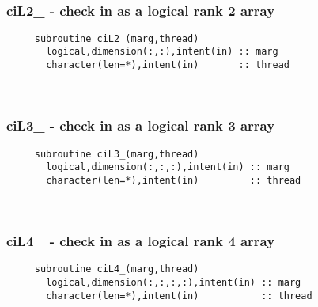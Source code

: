  
\mbox{}\hrulefill\ 
 
  \subsubsection{ciL2\_ - check in as a logical rank 2 array}

\begin{verbatim} 
     subroutine ciL2_(marg,thread)
       logical,dimension(:,:),intent(in) :: marg
       character(len=*),intent(in)       :: thread
 \end{verbatim}%
 
 
\mbox{}\hrulefill\ 
 
  \subsubsection{ciL3\_ - check in as a logical rank 3 array}

\begin{verbatim} 
     subroutine ciL3_(marg,thread)
       logical,dimension(:,:,:),intent(in) :: marg
       character(len=*),intent(in)         :: thread
 \end{verbatim}%
 
 
\mbox{}\hrulefill\ 
 
  \subsubsection{ciL4\_ - check in as a logical rank 4 array}

\begin{verbatim} 
     subroutine ciL4_(marg,thread)
       logical,dimension(:,:,:,:),intent(in) :: marg
       character(len=*),intent(in)           :: thread
 \end{verbatim}%
 
